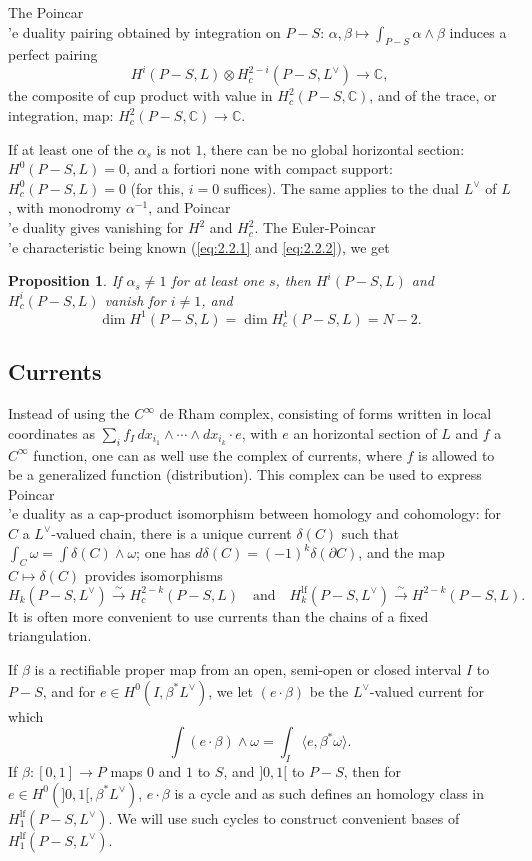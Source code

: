\documentclass[12pt,a4paper]{article}
\theoremstyle{plain}
\newtheorem{proposition}[theorem]{Proposition}
\theoremstyle{definition}
\theoremstyle{remark}
\newcommand{\CC}{\mathbb{C}}
\numberwithin{equation}{section}
\providecommand{\CC}{\mathbb{C}}
\begin{document}
The Poincar\\'e duality pairing obtained by integration on $P-S$: $\alpha, \beta \mapsto \int_{P-S} \alpha \wedge \beta$ induces a perfect pairing
\[
H^i(P-S, L) \otimes H^{2-i}_c(P-S, L^\vee) \to \CC,
\]
the composite of cup product with value in $H^2_c(P-S, \CC)$, and of the trace, or integration, map: $H^2_c(P-S, \CC) \to \CC$.

If at least one of the $\alpha_s$ is not $1$, there can be no global horizontal section: $H^0(P-S, L) = 0$, and a fortiori none with compact support: $H^0_c(P-S, L) = 0$ (for this, $i = 0$ suffices). The same applies to the dual $L^\vee$ of $L$, with monodromy $\alpha^{-1}$, and Poincar\\'e duality gives vanishing for $H^2$ and $H^2_c$. The Euler-Poincar\\'e characteristic being known (\eqref{eq:2.2.1} and \eqref{eq:2.2.2}), we get
\begin{proposition}\label{prop:2.3}
If $\alpha_s \neq 1$ for at least one $s$, then $H^i(P-S, L)$ and $H^i_c(P-S, L)$ vanish for $i \neq 1$, and
\[
\dim H^1(P-S, L) = \dim H^1_c(P-S, L) = N - 2.
\]
\end{proposition}

\subsection{Currents}
Instead of using the $C^\infty$ de Rham complex, consisting of forms written in local coordinates as $\sum_i f_I \, dx_{i_1} \wedge \cdots \wedge dx_{i_k} \cdot e$, with $e$ an horizontal section of $L$ and $f$ a $C^\infty$ function, one can as well use the complex of currents, where $f$ is allowed to be a generalized function (distribution). This complex can be used to express Poincar\\'e duality as a cap-product isomorphism between homology and cohomology: for $C$ a $L^\vee$-valued chain, there is a unique current $\delta(C)$ such that $\int_C \omega = \int \delta(C) \wedge \omega$; one has $d\delta(C) = (-1)^k \delta(\partial C)$, and the map $C \mapsto \delta(C)$ provides isomorphisms
\[
H_k(P-S, L^\vee) \xrightarrow{\sim} H^{2-k}_c(P-S, L) \quad \text{and} \quad H^{\mathrm{lf}}_k(P-S, L^\vee) \xrightarrow{\sim} H^{2-k}(P-S, L).
\]
It is often more convenient to use currents than the chains of a fixed triangulation.

If $\beta$ is a rectifiable proper map from an open, semi-open or closed interval $I$ to $P-S$, and for $e \in H^0(I, \beta^*L^\vee)$, we let $(e \cdot \beta)$ be the $L^\vee$-valued current for which
\[
\int (e \cdot \beta) \wedge \omega = \int_I \langle e, \beta^*\omega \rangle.
\]
If $\beta: [0,1] \to P$ maps $0$ and $1$ to $S$, and $]0,1[$ to $P-S$, then for $e \in H^0(]0,1[, \beta^*L^\vee)$, $e \cdot \beta$ is a cycle and as such defines an homology class in $H^{\mathrm{lf}}_1(P-S, L^\vee)$. We will use such cycles to construct convenient bases of $H^{\mathrm{lf}}_1(P-S, L^\vee)$.
\end{document}
